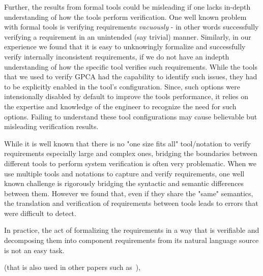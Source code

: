 Further, the results from formal tools could be misleading if one lacks in-depth understanding of how the tools perform verification. One well known problem with formal tools is verifying requirements \emph{vacuously} - in other words successfully verifying a requirement in an unintended (say trivial) manner. Similarly, in our experience we found that it is easy to unknowingly formalize and successfully verify internally inconsistent requirements, if we do not have an indepth understanding of how the specific tool verifies such requirements. While the tools that we used to verify GPCA had the capability to identify such issues, they had to be explicitly enabled in the tool's configuration. Since, such options were intensionally disabled by default to improve the tools performance, it relies on the expertise and knowledge of the engineer to recognize the need for such options. Failing to understand these tool configurations may cause believable but misleading verification results.

While it is well known that there is no "one size fits all" tool/notation to verify requirements especially large and complex ones, bridging the boundaries between different tools to perform system verification is often very problematic. When we use multiple tools and notations to capture and verify requirements, one well known challenge is rigorously bridging the syntactic and semantic differences between them. However we found that, even if they share the "same" semantics, the translation and verification of requirements between tools leads to errors that were difficult to detect.

In practice, the act of formalizing the requirements in a way that is verifiable and decomposing them into component requirements from its natural language source is not an easy task.

(that is also used in other papers such as~\cite{jeffords2010model,kauppinen2007re, lempia2009requirements}),

\fi
